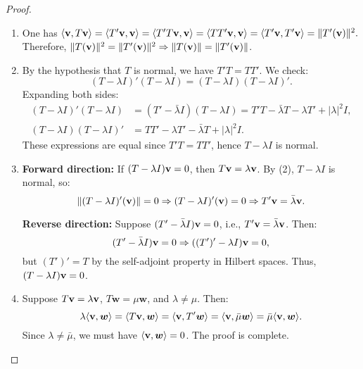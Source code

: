 \begin{proof}
\begin{enumerate}[label=\arabic*.]
\item One has
$\langle {\bf v}, T{\bf v} \rangle = \langle T'{\bf v}, {\bf v} \rangle = \langle T'T {\bf v}, {\bf v} \rangle = \langle TT'{\bf v}, {\bf v} \rangle = \langle T'{\bf v}, T'{\bf v} \rangle = \|T'({\bf v})\|^2.$ 
Therefore, \( \|T({\bf v})\|^2 = \|T'({\bf v})\|^2 \Rightarrow \|T({\bf v})\| = \|T'({\bf v})\| \).

\item
By the hypothesis that \( T \) is normal, we have \( T'T = TT' \). We check:
\[
(T - \lambda I)'(T - \lambda I) = (T - \lambda I)(T - \lambda I)'.
\]
Expanding both sides:
\begin{align*}
(T - \lambda I)'(T - \lambda I) &= (T' - \bar{\lambda} I)(T - \lambda I) = T'T - \bar{\lambda} T - \lambda T' + |\lambda|^2 I, \\
(T - \lambda I)(T - \lambda I)' &= T T' - \lambda T' - \bar{\lambda} T + |\lambda|^2 I.
\end{align*}
These expressions are equal since \( T'T = TT' \), hence \( T - \lambda I \) is normal.

\item
\textbf{Forward direction:} If \( (T - \lambda I){\bf v} = 0 \), then \( T{\bf v} = \lambda {\bf v} \). By (2), \( T - \lambda I \) is normal, so:
\[
\| (T - \lambda I)'({\bf v}) \| = 0 \Rightarrow (T - \lambda I)'({\bf v}) = 0 \Rightarrow T'{\bf v} = \bar{\lambda} {\bf v}.
\]

\textbf{Reverse direction:} Suppose \( (T' - \bar{\lambda} I){\bf v} = 0 \), i.e., \( T'{\bf v} = \bar{\lambda} {\bf v} \). Then:
\[
(T' - \bar{\lambda} I) {\bf v} = 0 \Rightarrow ((T')' - \lambda I) {\bf v} = 0,
\]
but \( (T')' = T \) by the self-adjoint property in Hilbert spaces. Thus, \( (T - \lambda I){\bf v} = 0 \).

\item
Suppose \( T{\bf v} = \lambda {\bf v} \), \( T\bm{w} = \mu \bm{w} \), and \( \lambda \neq \mu \). Then:
\[
\lambda \langle {\bf v}, \bm{w} \rangle = \langle T{\bf v}, \bm{w} \rangle = \langle {\bf v}, T'\bm{w} \rangle = \langle {\bf v}, \bar{\mu} \bm{w} \rangle = \bar{\mu} \langle {\bf v}, \bm{w} \rangle.
\]
Since \( \lambda \neq \bar{\mu} \), we must have \( \langle {\bf v}, \bm{w} \rangle = 0 \). The proof is complete.
\end{enumerate}
\end{proof}

